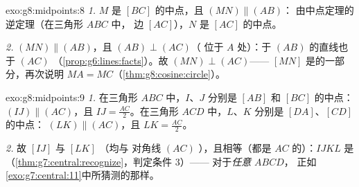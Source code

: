 \begin{solution}{exo:g8:midpoints:8}
\emph{1.} $M$ 是 $[BC]$ 的中点，且 $(MN) \parallel (AB)$：
由中点定理的逆定理（在三角形 $ABC$ 中，
边 $[AC]$），$N$ 是 $[AC]$ 的中点。

\emph{2.} $(MN) \parallel (AB)$，且 $(AB) \perp (AC)$（
位于 $A$ 处）：于 $(AB)$ 的直线也于 $(AC)$
（\cref{prop:g6:lines:facts}）。故 $(MN) \perp (AC)$——
$[MN]$ 是的一部分，再次说明
$MA = MC$（\cref{thm:g8:cosine:circle}）。
\end{solution}

\begin{solution}{exo:g8:midpoints:9}
\emph{1.} 在三角形 $ABC$ 中，$I$、$J$ 分别是 $[AB]$ 和
$[BC]$ 的中点：$(IJ) \parallel (AC)$，且 $IJ = \frac{AC}{2}$。在三角形
$ACD$ 中，$L$、$K$ 分别是 $[DA]$、$[CD]$ 的中点：
$(LK) \parallel (AC)$，且 $LK = \frac{AC}{2}$。

\emph{2.} 故 $[IJ]$ 与 $[LK]$ （均与
对角线 $(AC)$ ），且相等（都是 $AC$ 的）：$IJKL$ 是
（\cref{thm:g7:central:recognize}，判定条件 3）——
对于\emph{任意} $ABCD$，
正如\cref{exo:g7:central:11}中所猜测的那样。
\end{solution}

